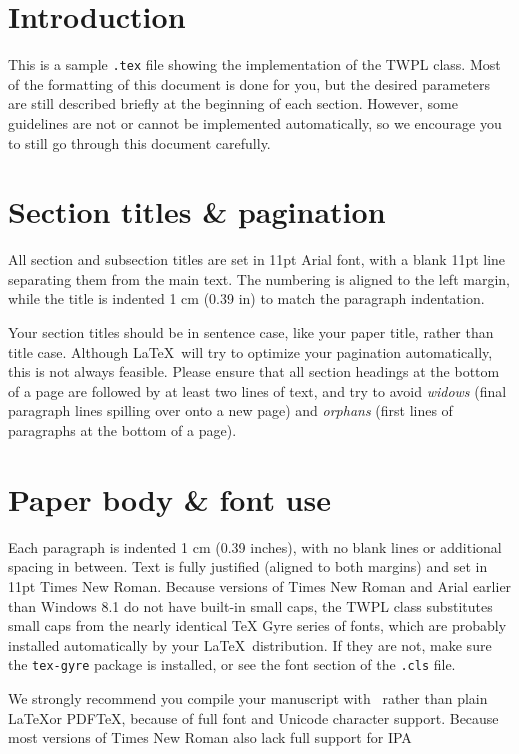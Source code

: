 \documentclass[xelatex,linguex]{TWPL}
\author{Jane Smith}
\affiliation{University of Wherever}
\begin{document}
\section{Introduction}

This is a sample \texttt{.tex} file showing the implementation of the TWPL class. Most of the formatting of this document is done for you, but the desired parameters are still described briefly at the beginning of each section. However, some guidelines are not or cannot be implemented automatically, so we encourage you to still go through this document carefully.

\section{Section titles \& pagination}

All section and subsection titles are set in 11pt Arial font, with a blank 11pt line separating them from the main text. The numbering is aligned to the left margin, while the title is indented 1 cm (0.39 in) to match the paragraph indentation.

Your section titles should be in sentence case, like your paper title, rather than title case. Although \LaTeX\ will try to optimize your pagination automatically, this is not always feasible. Please ensure that all section headings at the bottom of a page are followed by at least two lines of text, and try to avoid \textit{widows} (final paragraph lines spilling over onto a new page) and \textit{orphans} (first lines of paragraphs at the bottom of a page).

\section{Paper body \& font use}

Each paragraph is indented 1 cm (0.39 inches), with no blank lines or additional spacing in between. Text is fully justified (aligned to both margins) and set in 11pt Times New Roman. Because versions of Times New Roman and Arial earlier than Windows 8.1 do not have built-in small caps, the TWPL class substitutes small caps from the nearly identical TeX Gyre series of fonts, which are probably installed automatically by your \LaTeX\ distribution. If they are not, make sure the \texttt{tex-gyre} package is installed, or see the font section of the \texttt{.cls} file.

We strongly recommend you compile your manuscript with \XeLaTeX\ rather than plain \LaTeX or PDF\TeX, because of full font and Unicode character support. Because most versions of Times New Roman also lack full support for IPA 
\end{document}
